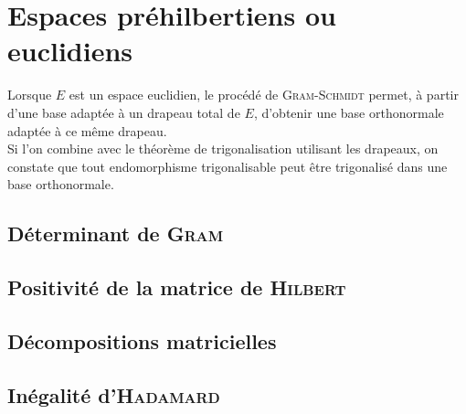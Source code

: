 \chapter{Espaces préhilbertiens ou euclidiens}

Lorsque $E$ est un espace euclidien, le procédé de \textsc{Gram}-\textsc{Schmidt} permet, à partir d'une base adaptée à un drapeau total de $E$, d'obtenir une base orthonormale adaptée à ce même drapeau. \\
Si l'on combine avec le théorème de trigonalisation utilisant les drapeaux, on constate que tout endomorphisme trigonalisable peut être trigonalisé dans une base orthonormale. 


\newpage

\section{Déterminant de \textsc{Gram}} \label{matrice_gram}


\section{Positivité de la matrice de \textsc{Hilbert}}


\section{Décompositions matricielles}


\section{Inégalité d'\textsc{Hadamard}}



